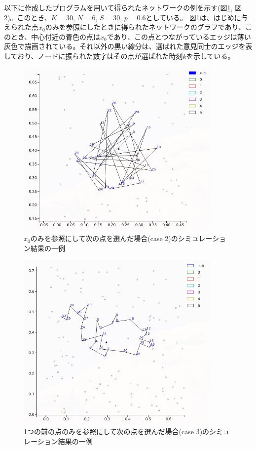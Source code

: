 以下に作成したプログラムを用いて得られたネットワークの例を示す(図\ref{fig:f9}, 図\ref{fig:f10})。このとき、$K=30$, $N=6$, $S=30$, $p=0.6$としている。
図\ref{fig:f9}は、はじめに与えられた点$x_{0}$のみを参照にしたときに得られたネットワークのグラフであり、このとき、中心付近の青色の点は$x_{0}$であり、この点とつながっているエッジは薄い灰色で描画されている。それ以外の黒い線分は、選ばれた意見同士のエッジを表しており、ノードに振られた数字はその点が選ばれた時刻$k$を示している。
\begin{figure}[H]
    \begin{center}
        \includegraphics[width=10cm]{../simple3/case_2.jpg}
        \caption{$x_{0}$のみを参照にして次の点を選んだ場合(case 2)のシミュレーション結果の一例}
        \label{fig:f9}
    \end{center}
\end{figure}
\begin{figure}[H]
    \begin{center}
        \includegraphics[width=10cm]{../simple3/case_3.jpg}
        \caption{1つの前の点のみを参照にして次の点を選んだ場合(case 3)のシミュレーション結果の一例}
        \label{fig:f10}
    \end{center}
\end{figure}
